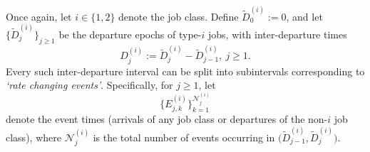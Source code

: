 \documentclass[11pt]{article}
\newcommand{\jp}[1]{\footnote{J-P: #1}}
\theoremstyle{remark}
\theoremstyle{definition}
\numberwithin{equation}{section}
\begin{document}
Once again, let $i \in \{1,2\}$ denote the job class. 
Define $\widetilde{D}^{(i)}_0 := 0$, and let $\Big\{\widetilde{D}^{(i)}_j\Big\}_{j \ge 1}$ be the departure epochs of type-$i$ jobs, with inter-departure times
\[
D^{(i)}_j := \widetilde{D}^{(i)}_{j} - \widetilde{D}^{(i)}_{j-1}, \ j \geq 1.
\]
Every such inter-departure interval can be split into subintervals corresponding to \textit{`rate changing events'}. 
Specifically, for $j \geq 1$, let
\[\Big\{E^{(i)}_{j,k}\Big\}_{k=1}^{\mathscr N^{(i)}_{j}}\] denote the event times (arrivals of any job class or departures of the non-$i$ job class), where $\mathscr N^{(i)}_{j}$ is the total number of events occurring in $\Big(\widetilde{D}^{(i)}_{j-1}, \widetilde{D}^{(i)}_{j}\Big)$. 
\end{document}
